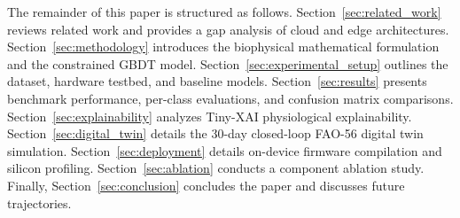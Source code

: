 The remainder of this paper is structured as follows. Section~\ref{sec:related_work} reviews related work and provides a gap analysis of cloud and edge architectures. Section~\ref{sec:methodology} introduces the biophysical mathematical formulation and the constrained GBDT model. Section~\ref{sec:experimental_setup} outlines the dataset, hardware testbed, and baseline models. Section~\ref{sec:results} presents benchmark performance, per-class evaluations, and confusion matrix comparisons. Section~\ref{sec:explainability} analyzes Tiny-XAI physiological explainability. Section~\ref{sec:digital_twin} details the 30-day closed-loop FAO-56 digital twin simulation. Section~\ref{sec:deployment} details on-device firmware compilation and silicon profiling. Section~\ref{sec:ablation} conducts a component ablation study. Finally, Section~\ref{sec:conclusion} concludes the paper and discusses future trajectories.
